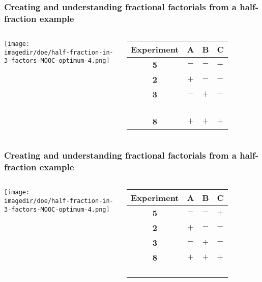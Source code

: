 \begin{frame}\frametitle{{\large Creating and understanding fractional factorials from a half-fraction example}}
	\begin{columns}
			\begin{center}
				\texttt{[image: \\imagedir/doe/half-fraction-in-3-factors-MOOC-optimum-4.png]}
			\end{center}

			\begin{tabulary}{\linewidth}{cccl}\hline 
				\textsf{\relax Experiment } & \textbf{\relax A } & \textbf{\relax B } & \textbf{\relax C } \\
				\hline 
				\color{myOrange} \textbf{5} & \(-\) & \(-\) & \(+\) \\
				\color{myOrange} \textbf{2} & \(+\) & \(-\) & \(-\) \\
				\color{myOrange} \textbf{3} & \(-\) & \(+\) & \(-\) \\
				 & & & \\
				 & & & \\
				 & & & \\
				 & & & \\
				\color{myOrange} \textbf{8} & \(+\) & \(+\) & \(+\) \\  \hline
			\end{tabulary}
	\end{columns}	
\end{frame}

\begin{frame}\frametitle{{\large Creating and understanding fractional factorials from a half-fraction example}}
	\begin{columns}
		\column{0.65\textwidth}
			\begin{center}
				\texttt{[image: \\imagedir/doe/half-fraction-in-3-factors-MOOC-optimum-4.png]}
			\end{center}

		\column{0.55\textwidth}
			\begin{tabulary}{\linewidth}{cccl}\hline 
				\textsf{\relax Experiment } & \textbf{\relax A } & \textbf{\relax B } & \textbf{\relax C } \\
				\hline 
				 \color{myOrange} \textbf{5} & \(-\) & \(-\) & \(+\) \\
				 \color{myOrange} \textbf{2} & \(+\) & \(-\) & \(-\) \\
				 \color{myOrange} \textbf{3} & \(-\) & \(+\) & \(-\) \\
				 \color{myOrange} \textbf{8} & \(+\) & \(+\) & \(+\) \\ \hline
				  & & & \\
				  & & & \\
				  & & & \\
				  & & & 
			\end{tabulary}
	\end{columns}	
\end{frame}

